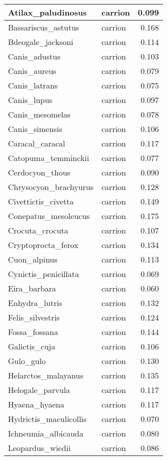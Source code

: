 \begin{table}
\begin{tabular}[t]{l|l|r}
\hline
Atilax\_paludinosus & carrion & 0.099\\
\hline
Bassariscus\_astutus & carrion & 0.168\\
\hline
Bdeogale\_jacksoni & carrion & 0.114\\
\hline
Canis\_adustus & carrion & 0.103\\
\hline
Canis\_aureus & carrion & 0.079\\
\hline
Canis\_latrans & carrion & 0.075\\
\hline
Canis\_lupus & carrion & 0.097\\
\hline
Canis\_mesomelas & carrion & 0.078\\
\hline
Canis\_simensis & carrion & 0.106\\
\hline
Caracal\_caracal & carrion & 0.117\\
\hline
Catopuma\_temminckii & carrion & 0.077\\
\hline
Cerdocyon\_thous & carrion & 0.090\\
\hline
Chrysocyon\_brachyurus & carrion & 0.128\\
\hline
Civettictis\_civetta & carrion & 0.149\\
\hline
Conepatus\_mesoleucus & carrion & 0.175\\
\hline
Crocuta\_crocuta & carrion & 0.107\\
\hline
Cryptoprocta\_ferox & carrion & 0.134\\
\hline
Cuon\_alpinus & carrion & 0.113\\
\hline
Cynictis\_penicillata & carrion & 0.069\\
\hline
Eira\_barbara & carrion & 0.060\\
\hline
Enhydra\_lutris & carrion & 0.132\\
\hline
Felis\_silvestris & carrion & 0.124\\
\hline
Fossa\_fossana & carrion & 0.144\\
\hline
Galictis\_cuja & carrion & 0.106\\
\hline
Gulo\_gulo & carrion & 0.130\\
\hline
Helarctos\_malayanus & carrion & 0.135\\
\hline
Helogale\_parvula & carrion & 0.117\\
\hline
Hyaena\_hyaena & carrion & 0.117\\
\hline
Hydrictis\_maculicollis & carrion & 0.070\\
\hline
Ichneumia\_albicauda & carrion & 0.080\\
\hline
Leopardus\_wiedii & carrion & 0.086\\

\end{tabular}
\end{table}
